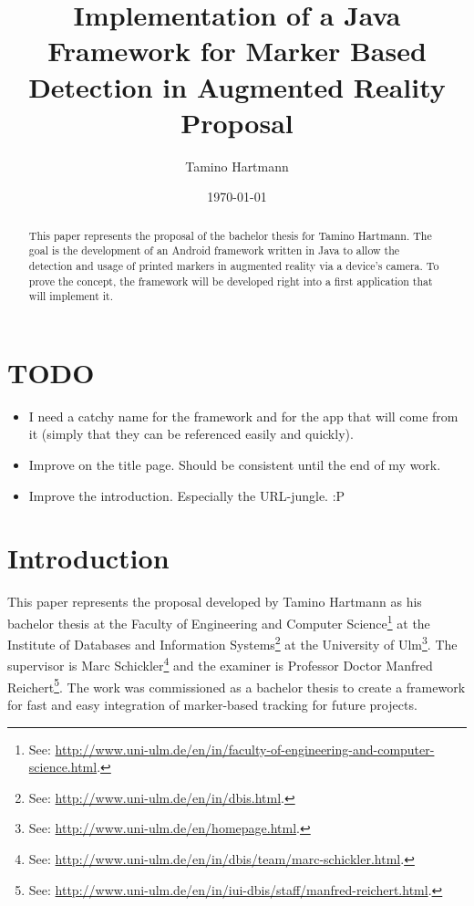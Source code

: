 \documentclass[a4paper,twoside]{article}
\begin{document}
\title{Implementation of a Java Framework for Marker Based Detection in Augmented Reality \\ {\large Proposal}}
\author{Tamino Hartmann}
\date{\today}

\maketitle
\thispagestyle{empty}

\begin{abstract}
This paper represents the proposal of the bachelor thesis for Tamino Hartmann.
The goal is the development of an Android framework written in Java to allow the detection and usage of printed markers in augmented reality via a device's camera.
To prove the concept, the framework will be developed right into a first application that will implement it.
\end{abstract}

\newpage
\mbox{}

\newpage

\tableofcontents

\newpage

\section*{TODO}

\begin{itemize}
	\item I need a catchy name for the framework and for the app that will come from it (simply that they can be referenced easily and quickly).
	\item Improve on the title page. Should be consistent until the end of my work.
	\item Improve the introduction. Especially the URL-jungle. :P
\end{itemize}

\section{Introduction}

This paper represents the proposal developed by Tamino Hartmann as his bachelor thesis at the Faculty of Engineering and Computer Science\footnote{See: \url{http://www.uni-ulm.de/en/in/faculty-of-engineering-and-computer-science.html}.} at the Institute of Databases and Information Systems\footnote{See: \url{http://www.uni-ulm.de/en/in/dbis.html}.} at the University of Ulm\footnote{See: \url{http://www.uni-ulm.de/en/homepage.html}.}.
The supervisor is Marc Schickler\footnote{See: \url{http://www.uni-ulm.de/en/in/dbis/team/marc-schickler.html}.} and the examiner is Professor Doctor Manfred Reichert\footnote{See: \url{http://www.uni-ulm.de/en/in/iui-dbis/staff/manfred-reichert.html}.}.
The work was commissioned as a bachelor thesis to create a framework for fast and easy integration of marker-based tracking for future projects.
\end{document}
